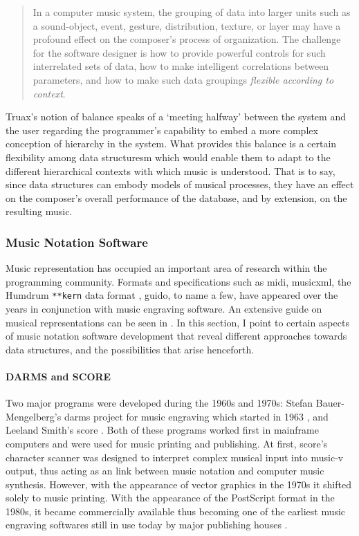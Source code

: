 	\begin{quote}
		In a computer music system, the grouping of data into larger units such as a sound-object, event, gesture, distribution, texture, or layer may have a profound effect on the composer's process of organization. The challenge for the software designer is how to provide powerful controls for such interrelated sets of data, how to make intelligent correlations between parameters, and how to make such data groupings \textit{flexible according to context}. \im \parencite[157]{Emm86:The}
	\end{quote}

	Truax's notion of balance speaks of a `meeting halfway' between the system and the user regarding the programmer's capability to embed a more complex conception of hierarchy in the system. What provides this balance is a certain flexibility among data structuresm which would enable them to adapt to the different hierarchical contexts with which music is understood. That is to say, since data structures can embody models of musical processes, they have an effect on the composer's overall performance of the database, and by extension, on the resulting music. 

\subsubsection{Music Notation Software}
\label{applications:notation}

Music representation has occupied an important area of research within the programming community. Formats and specifications such as \gls{midi}, \gls{musicxml}, the Humdrum \texttt{**kern} data format \parencite{DBLP:conf/ismir/Sapp05}, \gls{guido}, to name a few, have appeared over the years in conjunction with music engraving software. An extensive guide on musical representations can be seen in \textcite{Selfridge-Field:1997:BMH:275928}. In this section, I point to certain aspects of music notation software development that reveal different approaches towards data structures, and the possibilities that arise henceforth.

\paragraph{DARMS and SCORE}
Two major programs were developed during the 1960s and 1970s: Stefan Bauer-Mengelberg's \gls{darms} project for music engraving which started in 1963 \parencites{icmc/bbp2372.1983.002}{10.2307/30204239}, and Leeland Smith's  \gls{score} \parencite{smith1971}. Both of these programs worked first in mainframe computers and were used for music printing and publishing. At first, \gls{score}'s character scanner was designed to interpret complex musical input into \gls{music-v} output, thus acting as an link between music notation and computer music synthesis. However, with the appearance of vector graphics in the 1970s it shifted solely to music printing.  With the appearance of the PostScript format in the 1980s, it became commercially available thus becoming one of the earliest music engraving softwares still in use today by major publishing houses \parencite{scoremus}. 

